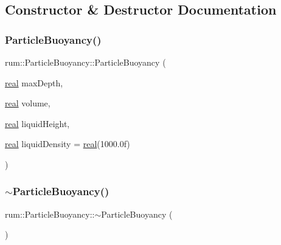 \subsection{Constructor \& Destructor Documentation}
\mbox{\label{classrum_1_1_particle_buoyancy_a25df269bba530e8275ee0e22e9fce166}} 
\subsubsection{\texorpdfstring{Particle\+Buoyancy()}{ParticleBuoyancy()}}
{\footnotesize\ttfamily rum\+::\+Particle\+Buoyancy\+::\+Particle\+Buoyancy (\begin{DoxyParamCaption}\item[{\hyperlink{namespacerum_a7e8cca23573d5eaead0f138cbaa4862c}{real}}]{max\+Depth,  }\item[{\hyperlink{namespacerum_a7e8cca23573d5eaead0f138cbaa4862c}{real}}]{volume,  }\item[{\hyperlink{namespacerum_a7e8cca23573d5eaead0f138cbaa4862c}{real}}]{liquid\+Height,  }\item[{\hyperlink{namespacerum_a7e8cca23573d5eaead0f138cbaa4862c}{real}}]{liquid\+Density = {\ttfamily \hyperlink{namespacerum_a7e8cca23573d5eaead0f138cbaa4862c}{real}(1000.0f)} }\end{DoxyParamCaption})\hspace{0.3cm}{\ttfamily [explicit]}}

\mbox{\label{classrum_1_1_particle_buoyancy_a892e6f064e5eb1be8e7d2af8c76b856c}} 
\subsubsection{\texorpdfstring{$\sim$\+Particle\+Buoyancy()}{~ParticleBuoyancy()}}
{\footnotesize\ttfamily rum\+::\+Particle\+Buoyancy\+::$\sim$\+Particle\+Buoyancy (\begin{DoxyParamCaption}{ }\end{DoxyParamCaption})}



